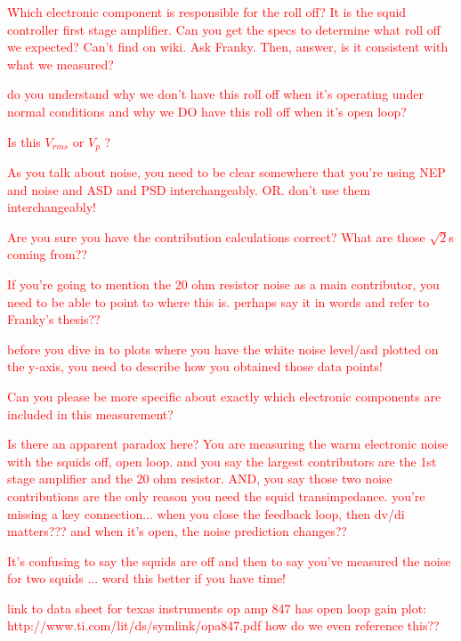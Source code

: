 \textcolor{red}{Which electronic component is responsible for the roll off? It is the squid controller first stage amplifier. Can you get the specs to determine what roll off we expected? Can't find on wiki. Ask Franky. Then, answer, is it consistent with what we measured?}

\textcolor{red}{do you understand why we don't have this roll off when it's operating under normal conditions and why we DO have this roll off when it's open loop?}

\textcolor{red}{Is this $V_{rms}$ or $V_{p}$ ?}

\textcolor{red}{As you talk about noise, you need to be clear somewhere that you're using NEP and noise and ASD and PSD interchangeably. OR. don't use them interchangeably!}

\textcolor{red}{Are you sure you have the contribution calculations correct? What are those $\sqrt{2}$s coming from??}

\textcolor{red}{If you're going to mention the 20 ohm resistor noise as a main contributor, you need to be able to point to where this is. perhaps say it in words and refer to Franky's thesis??}

\textcolor{red}{before you dive in to plots where you have the white noise level/asd plotted on the y-axis, you need to describe how you obtained those data points!}

\textcolor{red}{Can you please be more specific about exactly which electronic components are included in this measurement?}

\textcolor{red}{Is there an apparent paradox here? You are measuring the warm electronic noise with the squids off, open loop. and you say the largest contributors are the 1st stage amplifier and the 20 ohm resistor. AND, you say those two noise contributions are the only reason you need the squid transimpedance. you're missing a key connection... when you close the feedback loop, then dv/di matters??? and when it's open, the noise prediction changes??}

\textcolor{red}{It's confusing to say the squids are off and then to say you've measured the noise for two squids ... word this better if you have time!}

\textcolor{red}{link to data sheet for texas instruments op amp 847 has open loop gain plot: http://www.ti.com/lit/ds/symlink/opa847.pdf    how do we even reference this??}


